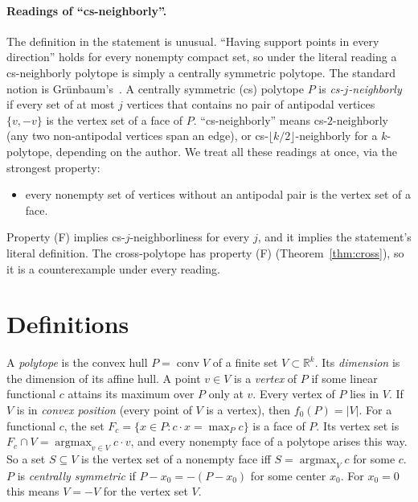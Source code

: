 \documentclass[11pt]{article}
\theoremstyle{definition}
\theoremstyle{remark}
\begin{document}
\paragraph{Readings of ``cs-neighborly''.}
The definition in the statement is unusual. ``Having support points in every
direction'' holds for every nonempty compact set, so under the literal reading a
cs-neighborly polytope is simply a centrally symmetric polytope. The standard notion is
Gr\"unbaum's~\cite{Gr}. A centrally symmetric (cs) polytope $P$ is
\emph{cs-$j$-neighborly} if every set of at most $j$ vertices that contains no pair of
antipodal vertices $\{v,-v\}$ is the vertex set of a face of $P$. ``cs-neighborly'' means
cs-$2$-neighborly (any two non-antipodal vertices span an edge), or cs-$\lfloor k/2\rfloor$-neighborly
for a $k$-polytope, depending on the author. We treat all these readings at
once, via the strongest property:
\begin{itemize}
\item[(F)] every nonempty set of vertices without an antipodal pair is the vertex set of a face.
\end{itemize}
Property (F) implies cs-$j$-neighborliness for every $j$, and it implies the
statement's literal definition. The cross-polytope has property (F)
(Theorem~\ref{thm:cross}), so it is a counterexample under every reading.

\section{Definitions}
A \emph{polytope} is the convex hull $P=\operatorname{conv}V$ of a finite set
$V\subset\mathbb R^k$. Its \emph{dimension} is the dimension of its affine hull. A
point $v\in V$ is a \emph{vertex} of $P$ if some linear functional $c$ attains its
maximum over $P$ only at $v$. Every vertex of $P$ lies in $V$. If $V$ is in
\emph{convex position} (every point of $V$ is a vertex), then $f_0(P)=|V|$. For a
functional $c$, the set $F_c=\{x\in P: c\cdot x=\max_P c\}$ is a face of $P$. Its
vertex set is $F_c\cap V=\operatorname{argmax}_{v\in V} c\cdot v$, and every
nonempty face of a polytope arises this way. So a set $S\subseteq V$ is the vertex set of a
nonempty face iff $S=\operatorname{argmax}_{V}c$ for some $c$. $P$ is \emph{centrally
symmetric} if $P-x_0=-(P-x_0)$ for some center $x_0$. For $x_0=0$ this means $V=-V$
for the vertex set $V$.
\end{document}
